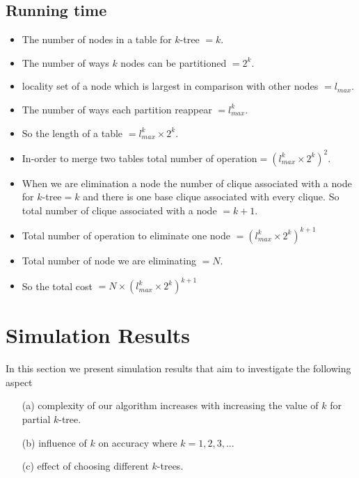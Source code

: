 \documentclass[12pt]{article}
\begin{document}
\subsection{Running time}
\begin{itemize}[noitemsep]
\item The number of nodes in a table for $k$-tree $=k$.
\item The number of ways $k$ nodes can be partitioned $=2^k$.
\item locality set of a node which is largest in comparison with other nodes $=l_{max}$.
\item The number of ways each partition reappear $=l_{max}^k$.
\item So the length of a table $=l_{max}^k \times 2^k$.
\item In-order to merge two tables total number of operation$=(l_{max}^k \times 2^k)^2$.
\item When we are elimination a node the number of clique associated with a node for $k$-tree$=k$ and there is one base clique associated with every clique. So total number of clique associated with a node $=k+1$.
\item Total number of operation to eliminate one node $=(l_{max}^k \times 2^k)^{k+1}$
\item Total number of node we are eliminating $=N$.
\item So the total cost $=N \times( l_{max}^k \times 2^k)^{k+1}$
\
\end{itemize}
\section{Simulation Results}
In this section we present simulation results that aim to investigate the following aspect 
\begin{itemize}
\item[(a)] complexity of our algorithm increases with increasing the value of $k$ for partial $k$-tree.
\item[(b)] influence of $k$ on accuracy where $k=1,2,3,..$.
\item[(c)] effect of choosing different $k$-trees.
\end{itemize}
 
\end{document}
